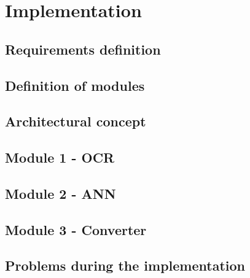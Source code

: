 %
% 

\chapter{Implementation}
\label{Implementation of the application}

\section{Requirements definition}

\section{Definition of modules}

\section{Architectural concept}

\section{Module 1 - OCR}

\section{Module 2 - ANN}

\section{Module 3 - Converter}

\section{Problems during the implementation}